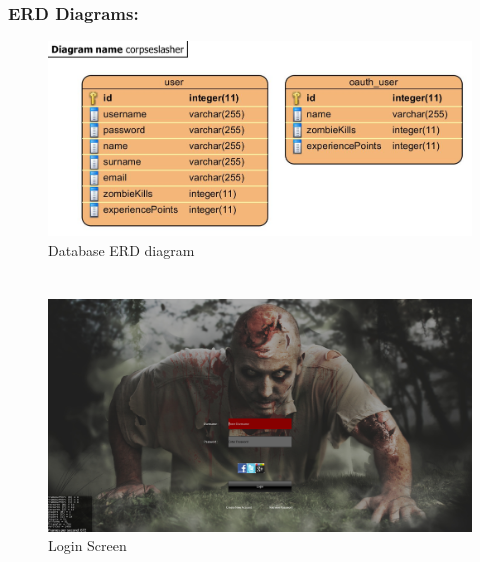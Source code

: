 \documentclass[letterpaper]{article}
\begin{document}
				\vspace{0.2in}	
				\subsubsection*{ERD Diagrams:}
				\vspace{0.1in}
				
					\begin{figure}[H]
					\centering
					\includegraphics[width=180mm]{UML_Diagram/ERD/Database.jpg}
					\caption{Database ERD diagram}
					\label{overflow}
					\end{figure}
					
					
		\vspace{0.2in}
		
		\section*{\colorbox{blue}{}} 
		\vspace{0.1in}
		
		\begin{figure}[H]
		\centering
		\includegraphics[width=130mm]		{GUI_ScreenShots/LoginScreen.jpg}
		\caption{Login Screen}
		\end{figure}
		
\end{document}
